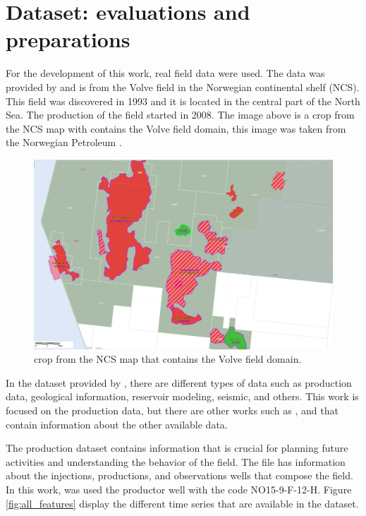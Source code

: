 
\section{Dataset: evaluations and preparations}
\label{sec:InformationsAndAvaliations}

For the development of this work, real field data were used. The data was provided by \cite{equinor2018volve} and is from the Volve field in the Norwegian continental shelf (NCS). This field was discovered in 1993 and it is located in the central part of the North Sea. The production of the field started in 2008. The image above is a crop from the NCS map with contains the Volve field domain, this image was taken from the Norwegian Petroleum \cite{directorate2017factpages}.

\begin{figure}[h!]
    \centering
    \includegraphics[width=1.0\textwidth]{images/volve_field_my.png}
    \caption{crop from the NCS map that contains the Volve field domain.}
    \label{fig:volve_field}
\end{figure}

In the dataset provided by \cite{equinor2018volve}, there are different types of data such as production data, geological information, reservoir modeling, seismic, and others. This work is focused on the production data, but there are other works such as \cite{sen2019estimation}, and \cite{ravasi2015vector} that contain information about the other available data.

The production dataset contains information that is crucial for planning future activities and understanding the behavior of the field. The file has information about the injections, productions, and observations wells that compose the field. In this work, was used the productor well with the code NO15-9-F-12-H. Figure \ref{fig:all_features} display the different time series that are available in the dataset.

